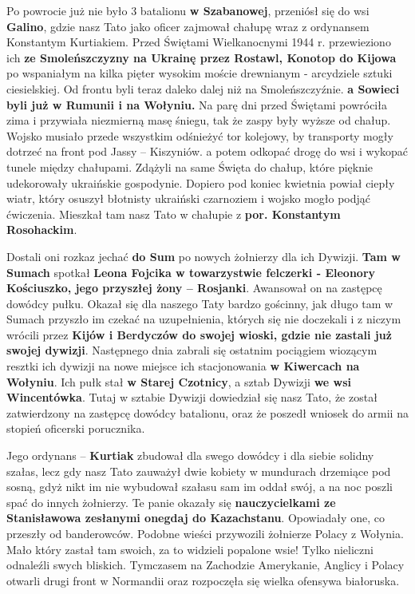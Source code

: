 Po powrocie już nie było 3 batalionu \textbf{w Szabanowej}, przeniósł się do wsi \textbf{Galino}, gdzie nasz Tato jako oficer zajmował chałupę wraz z ordynansem Konstantym Kurtiakiem. Przed Świętami Wielkanocnymi 1944 r. przewieziono ich \textbf{ze Smoleńszczyzny na Ukrainę przez Rostawl, Konotop do Kijowa} po wspaniałym na kilka pięter wysokim moście drewnianym - arcydziele sztuki ciesielskiej. Od frontu byli teraz daleko dalej niż na Smoleńszczyźnie. \textbf{a Sowieci byli już w Rumunii i na Wołyniu.} Na parę dni przed Świętami powróciła zima i przywiała niezmierną masę śniegu, tak że zaspy były wyższe od chałup. Wojsko musiało przede wszystkim odśnieżyć tor kolejowy, by transporty mogły dotrzeć na front pod Jassy – Kiszyniów. a potem odkopać drogę do wsi i wykopać tunele między chałupami. Zdążyli na same Święta do chałup, które pięknie udekorowały ukraińskie gospodynie. Dopiero pod koniec kwietnia powiał ciepły wiatr, który osuszył błotnisty ukraiński czarnoziem i wojsko mogło podjąć ćwiczenia. Mieszkał tam nasz Tato w chałupie z \textbf{por. Konstantym Rosohackim}. 

Dostali oni rozkaz jechać \textbf{do Sum} po nowych żołnierzy dla ich Dywizji. \textbf{Tam w Sumach} spotkał \textbf{Leona Fojcika w towarzystwie felczerki - Eleonory Kościuszko, jego przyszłej żony – Rosjanki}. Awansował on na zastępcę dowódcy pułku. Okazał się dla naszego Taty bardzo gościnny, jak długo tam w Sumach przyszło im czekać na uzupełnienia, których się nie doczekali i z niczym wrócili przez \textbf{Kijów i Berdyczów do swojej wioski, gdzie nie zastali już swojej dywizji}. Następnego dnia zabrali się ostatnim pociągiem wiozącym resztki ich dywizji na nowe miejsce ich stacjonowania \textbf{w Kiwercach na Wołyniu}. Ich pułk stał \textbf{w Starej Czotnicy}, a sztab Dywizji \textbf{we wsi Wincentówka}. Tutaj w sztabie Dywizji dowiedział się nasz Tato, że został zatwierdzony na zastępcę dowódcy batalionu, oraz że poszedł wniosek do armii na stopień oficerski porucznika.

Jego ordynans – \textbf{Kurtiak} zbudował dla swego dowódcy i dla siebie solidny szałas, lecz gdy nasz Tato zauważył dwie kobiety w mundurach drzemiące pod sosną, gdyż nikt im nie wybudował szałasu sam im oddał swój, a na noc poszli spać do innych żołnierzy. Te  panie okazały się \textbf{nauczycielkami ze Stanisławowa zesłanymi onegdaj do Kazachstanu}. Opowiadały one, co przeszły od banderowców. Podobne wieści przywozili żołnierze Polacy z Wołynia. Mało który zastał tam swoich, za to widzieli popalone wsie! Tylko nieliczni odnaleźli swych bliskich. Tymczasem na Zachodzie Amerykanie, Anglicy i Polacy otwarli drugi front w Normandii oraz rozpoczęła się wielka ofensywa białoruska.

